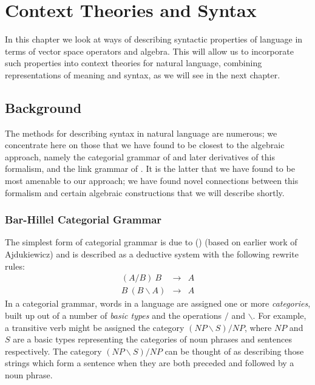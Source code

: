 \documentclass[12pt]{report}
\begin{document}
                

\chapter{Context Theories and Syntax} 

In this chapter we look at ways of describing syntactic properties of language in terms of vector space operators and algebra. This will allow us to incorporate such properties into context theories for natural language, combining representations of meaning and syntax, as we will see in the next chapter.

\section{Background}

The methods for describing syntax in natural language are numerous; we concentrate here on those that we have found to be closest to the algebraic approach, namely the categorial grammar of \cite{Lambek:58} and later derivatives of this formalism, and the link grammar of \cite{Sleator:91}. It is the latter that we have found to be most amenable to our approach; we have found novel connections between this formalism and certain algebraic constructions that we will describe shortly.

\subsection{Bar-Hillel Categorial Grammar}

The simplest form of categorial grammar is due to \citeauthor{Bar-Hillel:50} (\citeyear{Bar-Hillel:50,Bar-Hillel:64}) (based on earlier work of Ajdukiewicz) and is described as a deductive system with the following rewrite rules:
\begin{eqnarray*}
(A/B)\ B &\rightarrow& A\\
B\ (B\backslash A) &\rightarrow& A
\end{eqnarray*}
In a categorial grammar, words in a language are assigned one or more \emph{categories}, built up out of a number of \emph{basic types} and the operations $/$ and $\backslash$. For example, a transitive verb might be assigned the category $(\mathit{NP}\backslash S)/\mathit{NP}$, where $\mathit{NP}$ and $S$ are a basic types representing the categories of noun phrases and sentences respectively. The category $(\mathit{NP}\backslash S)/\mathit{NP}$ can be thought of as describing those strings which form a sentence when they are both preceded and followed by a noun phrase.
\end{document}
